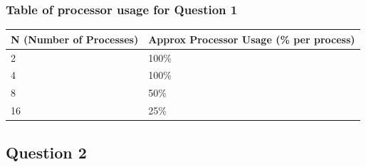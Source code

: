 \documentclass[12pt,a4paper,oneside]{article}
\begin{document}
\subsubsection{Table of processor usage for Question 1}
\begin{center}
\begin{tabular}{|l|l|}
\hline
N (Number of Processes) & Approx Processor Usage (\% per process) \\ \hline
2                       & 100\%                                   \\ \hline
4                       & 100\%                                   \\ \hline
8                       & 50\%                                    \\ \hline
16                      & 25\%                                    \\ \hline
\end{tabular}
\end{center}

\newpage

\subsection{Question 2}
\end{document}

